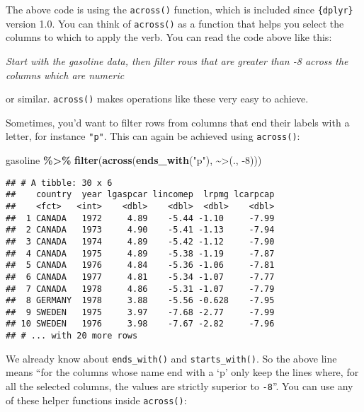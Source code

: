 \documentclass[
]{article}
\newenvironment{Shaded}{\begin{snugshade}}{\end{snugshade}}
\newcommand{\DataTypeTok}[1]{\textcolor[rgb]{0.13,0.29,0.53}{#1}}
\newcommand{\DecValTok}[1]{\textcolor[rgb]{0.00,0.00,0.81}{#1}}
\newcommand{\KeywordTok}[1]{\textcolor[rgb]{0.13,0.29,0.53}{\textbf{#1}}}
\newcommand{\NormalTok}[1]{#1}
\newcommand{\OperatorTok}[1]{\textcolor[rgb]{0.81,0.36,0.00}{\textbf{#1}}}
\newcommand{\StringTok}[1]{\textcolor[rgb]{0.31,0.60,0.02}{#1}}
\begin{document}
The above code is using the \texttt{across()} function, which is included since \texttt{\{dplyr\}} version 1.0. You
can think of \texttt{across()} as a function that helps you select the columns to which to apply the
verb. You can read the code above like this:

\emph{Start with the gasoline data, then filter rows that are greater than -8 across the columns
which are numeric}

or similar. \texttt{across()} makes operations like these very easy to achieve.

Sometimes, you'd want to filter rows from columns that end their labels with a letter, for instance
\texttt{"p"}. This can again be achieved using \texttt{across()}:

\begin{Shaded}
\begin{Highlighting}[]
\NormalTok{gasoline }\OperatorTok{\%\textgreater{}\%}
\StringTok{  }\KeywordTok{filter}\NormalTok{(}\KeywordTok{across}\NormalTok{(}\KeywordTok{ends\_with}\NormalTok{(}\StringTok{"p"}\NormalTok{), }\OperatorTok{\textasciitilde{}}\StringTok{\textasciigrave{}}\DataTypeTok{\textgreater{}}\StringTok{\textasciigrave{}}\NormalTok{(., }\DecValTok{{-}8}\NormalTok{)))}
\end{Highlighting}
\end{Shaded}

\begin{verbatim}
## # A tibble: 30 x 6
##    country  year lgaspcar lincomep  lrpmg lcarpcap
##    <fct>   <int>    <dbl>    <dbl>  <dbl>    <dbl>
##  1 CANADA   1972     4.89    -5.44 -1.10     -7.99
##  2 CANADA   1973     4.90    -5.41 -1.13     -7.94
##  3 CANADA   1974     4.89    -5.42 -1.12     -7.90
##  4 CANADA   1975     4.89    -5.38 -1.19     -7.87
##  5 CANADA   1976     4.84    -5.36 -1.06     -7.81
##  6 CANADA   1977     4.81    -5.34 -1.07     -7.77
##  7 CANADA   1978     4.86    -5.31 -1.07     -7.79
##  8 GERMANY  1978     3.88    -5.56 -0.628    -7.95
##  9 SWEDEN   1975     3.97    -7.68 -2.77     -7.99
## 10 SWEDEN   1976     3.98    -7.67 -2.82     -7.96
## # ... with 20 more rows
\end{verbatim}

We already know about \texttt{ends\_with()} and \texttt{starts\_with()}. So the above line means ``for the columns
whose name end with a `p' only keep the lines where, for all the selected columns, the values are
strictly superior to \texttt{-8}''. You can use any of these helper functions inside \texttt{across()}:
\end{document}
